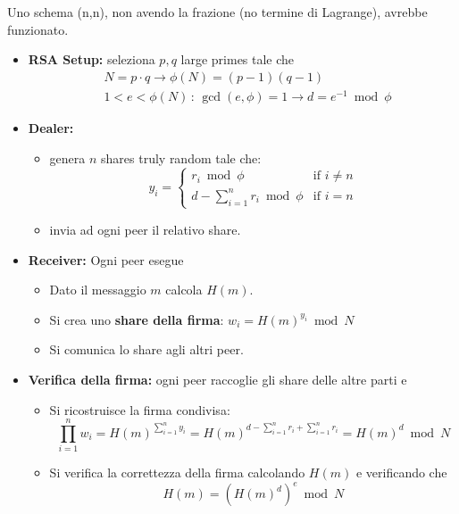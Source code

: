 \begin{note}
Uno schema (n,n), non avendo la frazione (no termine di Lagrange), avrebbe funzionato.\pagebreak
\begin{definition}\label{def:nnrsasign}
\begin{itemize}
    \item \textbf{RSA Setup:} seleziona $p,q$ large primes tale che
    \begin{equation*}
        \begin{aligned}
            &N=p\cdot q\longrightarrow \phi(N)=(p-1)(q-1)\\
            &1<e<\phi(N)\,:\,\gcd(e,\phi)=1\longrightarrow d=e^{-1}\bmod{\phi}
        \end{aligned}
    \end{equation*}
    \item \textbf{Dealer:}
    \begin{itemize}
        \item genera $n$ shares truly random tale che:
        \[y_i=
        \begin{cases}
            r_i\bmod{\phi}&\text{if $i\ne n$}\\
            d-\sum_{i=1}^{n}r_i\bmod{\phi}&\text{if $i=n$}
        \end{cases}    
        \]
        \item invia ad ogni peer il relativo share.
    \end{itemize}
    \item \textbf{Receiver:} Ogni peer esegue
    \begin{itemize}
        \item Dato il messaggio $m$ calcola $H(m)$.
        \item Si crea uno \textbf{share della firma}: $w_i=H(m)^{y_i}\bmod{N}$
        \item Si comunica lo share agli altri peer.
   \end{itemize}
   \item \textbf{Verifica della firma:} ogni peer raccoglie gli share delle altre parti e
   \begin{itemize}
       \item Si ricostruisce la firma condivisa:
       \[
       \prod_{i=1}^{n}w_i=H(m)^{\sum_{i=1}^{n}y_i}=H(m)^{d-\sum_{i=1}^{n}r_i+\sum_{i=1}^{n}r_i}=H(m)^d\bmod{N}
       \]
       \item Si verifica la correttezza della firma calcolando $H(m)$ e verificando che
       \[
       H(m)=(H(m)^d)^e\bmod{N}
       \]
   \end{itemize}
\end{itemize}
\end{definition}
\end{note}
